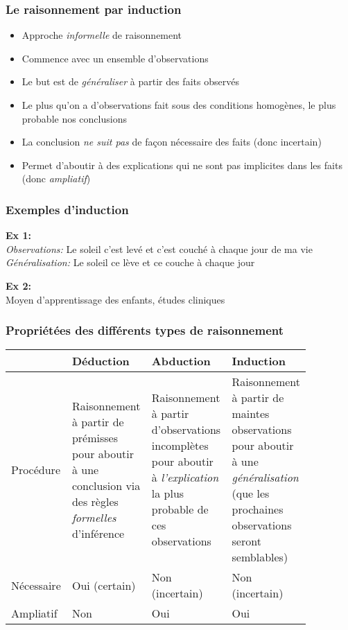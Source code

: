 \documentclass{beamer}
\begin{document}
\begin{frame}
    \frametitle{Le raisonnement par induction}
    \begin{itemize}
      \item Approche \emph{informelle} de raisonnement \pause
      \item Commence avec un ensemble d’observations \pause
      \item Le but est de \emph{généraliser} à partir des faits observés \pause
      \item Le plus qu’on a d’observations fait sous des conditions homogènes,
            le plus probable nos conclusions \pause
      \item La conclusion \emph{ne suit pas} de façon nécessaire des faits (donc incertain) \pause
      \item Permet d’aboutir à des explications qui ne sont pas
            implicites dans les faits (donc \emph{ampliatif})
    \end{itemize}
\end{frame}


\begin{frame}
    \frametitle{Exemples d'induction}
    \textbf{Ex 1:}\\ \pause
    \emph{Observations:} Le soleil c’est levé et c’est couché à chaque jour de ma vie \pause
    \emph{Généralisation:} Le soleil ce lève et ce couche à chaque jour\

    \bigskip \pause

    \textbf{Ex 2:}\\
    Moyen d’apprentissage des enfants, études cliniques
\end{frame}


\begin{frame}
    \frametitle{Propriétées des différents types de raisonnement}
    \begin{center}
      \begin{tabular}{ | p{0.14\linewidth} | p{0.24\linewidth} | p{0.24\linewidth} | p{0.24\linewidth} | }
        \hline \hline
         & Déduction & Abduction & Induction \\
        \hline \hline
        Procédure & Raisonnement à partir de prémisses pour aboutir à une conclusion via des règles \emph{formelles} d'inférence
                  & Raisonnement à partir d'observations incomplètes pour aboutir à \emph{l'explication}
                    la plus probable de ces observations
                  & Raisonnement à partir de maintes observations pour aboutir à une \emph{généralisation}
                    (que les prochaines observations seront semblables)
                  \\
        \hline
        Nécessaire & Oui (certain) & Non (incertain) & Non (incertain) \\
        \hline
        Ampliatif & Non & Oui & Oui \\
        \hline \hline
      \end{tabular}
    \end{center}
\end{frame}
\end{document}
